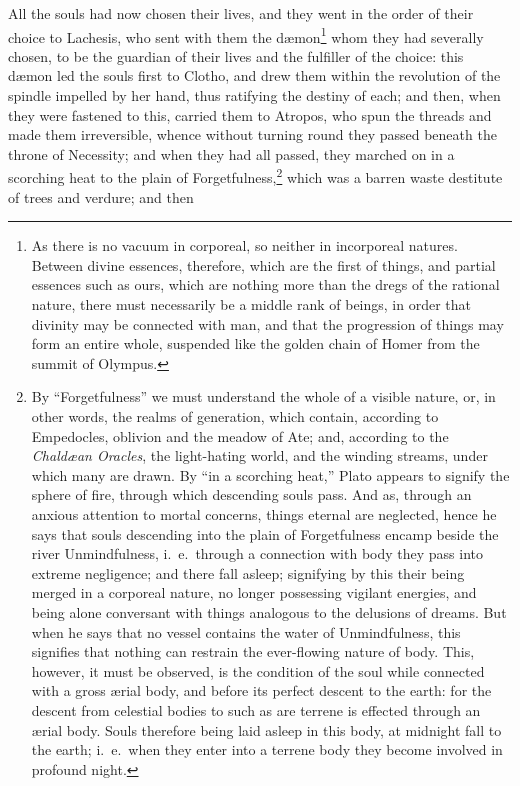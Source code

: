 \documentclass[12pt]{article}
\begin{document}
All the souls had now chosen their lives, and they went in the order of their
choice to Lachesis, who sent with them the d{\ae}mon\footnote{As there is no
vacuum in corporeal, so neither in incorporeal natures. Between divine
essences, therefore, which are the first of things, and partial essences such
as ours, which are nothing more than the dregs of the rational nature, there
must necessarily be a middle rank of beings, in order that divinity may be
connected with man, and that the progression of things may form an entire
whole, suspended like the golden chain of Homer from the summit of Olympus.}
whom they had severally chosen, to be the guardian of their lives and the
fulfiller of the choice: this d{\ae}mon led the souls first to Clotho, and drew
them within the revolution of the spindle impelled by her hand, thus ratifying
the destiny of each; and then, when they were fastened to this, carried them to
Atropos, who spun the threads and made them irreversible, whence without
turning round they passed beneath the throne of Necessity; and when they had
all passed, they marched on in a scorching heat to the plain of
Forgetfulness,\footnote{By ``Forgetfulness'' we must understand the whole of a
visible nature, or, in other words, the realms of generation, which contain,
according to Empedocles, oblivion and the meadow of Ate; and, according to the
\textit{Chald{\ae}an Oracles}, the light-hating world, and the winding streams,
under which many are drawn. By ``in a scorching heat,'' Plato appears to
signify the sphere of fire, through which descending souls pass. And as,
through an anxious attention to mortal concerns, things eternal are neglected,
hence he says that souls descending into the plain of Forgetfulness encamp
beside the river Unmindfulness, i.~e.~through a connection with body they pass
into extreme negligence; and there fall asleep; signifying by this their being
merged in a corporeal nature, no longer possessing vigilant energies, and being
alone conversant with things analogous to the delusions of dreams. But when he
says that no vessel contains the water of Unmindfulness, this signifies that
nothing can restrain the ever-flowing nature of body. This, however, it must be
observed, is the condition of the soul while connected with a gross {\ae}rial
body, and before its perfect descent to the earth: for the descent from
celestial bodies to such as are terrene is effected through an {\ae}rial body.
Souls therefore being laid asleep in this body, at midnight fall to the earth;
i.~e.~when they enter into a terrene body they become involved in profound
night.} which was a barren waste destitute of trees and verdure; and then
\end{document}
